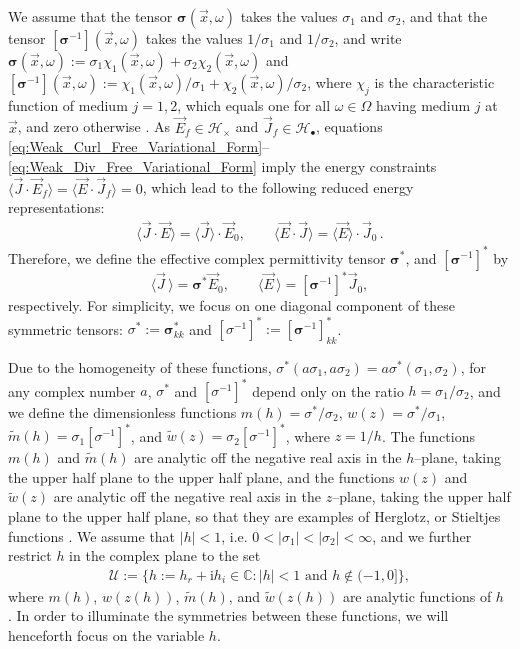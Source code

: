 \documentclass[english,12pt,jmp,graphicx]{revtex4-1}
\newcommand{\I}{\mathrm{i}}
\begin{document}
We assume that the tensor $\bm{\sigma}(\vec{x},\omega)$ takes the values $\sigma_1$
and $\sigma_2$, and that the tensor $[\bm{\sigma}^{-1}](\vec{x},\omega)$ takes the
values $1/\sigma_1$ and $1/\sigma_2$, and write 
$\bm{\sigma}(\vec{x},\omega):=\sigma_1\chi_1(\vec{x},\omega)+\sigma_2\chi_2(\vec{x},\omega)$ and
$[\bm{\sigma}^{-1}](\vec{x},\omega):=\chi_1(\vec{x},\omega)/\sigma_1+\chi_2(\vec{x},\omega)/\sigma_2$,
where $\chi_j$ is the characteristic function of medium $j=1,2$, which
equals one for all $\omega\in\Omega$ having medium $j$ at $\vec{x}$, and zero
otherwise \cite{Golden:CMP-473}. As $\vec{E}_f\in\mathscr{H}_\times$ and
$\vec{J}_f\in\mathscr{H}_{\bullet}$, equations
\eqref{eq:Weak_Curl_Free_Variational_Form}--\eqref{eq:Weak_Div_Free_Variational_Form}
imply the energy constraints
$\langle\vec{J}\cdot\vec{E}_f\rangle=\langle\vec{E}\cdot\vec{J}_f\rangle=0$, which lead to the
following reduced energy representations:   
%
\begin{align}\label{eq:Reduced_System_Energy_Representations}
  \langle\vec{J}\cdot\vec{E}\rangle=\langle\vec{J}\rangle\cdot\vec{E}_0, \qquad
  \langle\vec{E}\cdot\vec{J}\rangle=\langle\vec{E}\rangle\cdot\vec{J}_0\,.
\end{align}
%
Therefore, we define the effective complex permittivity
tensor $\bm{\sigma}^*$, and $[\bm{\sigma}^{-1}]^*$ by 
%
\begin{equation}\label{eq:eff_eps_def}
    \langle \vec{J} \,\rangle=  \bm{\sigma}^* \vec{E}_0,\qquad
    \langle \vec{E} \,\rangle=  [\bm{\sigma}^{-1}]^*\vec{J}_0,
\end{equation}
%
respectively. For simplicity, we focus on one diagonal component of
these symmetric tensors: $\sigma^*:=\bm{\sigma}^*_{kk}$ and
$[\sigma^{-1}]^*:=[\bm{\sigma}^{-1}]^*_{kk}$.

Due to the homogeneity of these functions,
$\sigma^*(a\sigma_1,a\sigma_2)=a\sigma^*(\sigma_1,\sigma_2)$, for any complex number $a$, $\sigma^*$ and
$[\sigma^{-1}]^*$ depend only on the ratio $h = \sigma_1/\sigma_2$, and we define the
dimensionless functions $m(h)=\sigma^*/\sigma_2$, $w(z)=\sigma^*/\sigma_1$,
$\tilde{m}(h)=\sigma_1[\sigma^{-1}]^*$, and $\tilde{w}(z)=\sigma_2[\sigma^{-1}]^*$, where 
$z=1/h$. The functions $m(h)$ and $\tilde{m}(h)$ are analytic off the
negative real axis in the $h$--plane, taking the upper half plane to
the upper half plane, and the functions $w(z)$ and $\tilde{w}(z)$ are
analytic off the negative real axis in the $z$--plane, taking the
upper half plane to the upper half plane, so that they are examples of
Herglotz, or Stieltjes functions \cite{Golden:CMP-473}. We assume that
$|h|<1$, i.e. $0<|\sigma_1|<|\sigma_2|<\infty$, and we further restrict $h$ in the
complex plane to the set    
%
\begin{align}\label{eq:h_Domain}
  \mathcal{U}:=\{h:=h_r+\I h_i\in\mathbb{C}: |h|<1 \text{ and } h\not\in(-1,0]\},
\end{align}
%
where $m(h)$, $w(z(h))$, $\tilde{m}(h)$, and $\tilde{w}(z(h))$ are
analytic functions of $h$ \cite{Golden:CMP-473}. In order to
illuminate the symmetries between these functions, we will henceforth
focus on the variable $h$.
\end{document}
